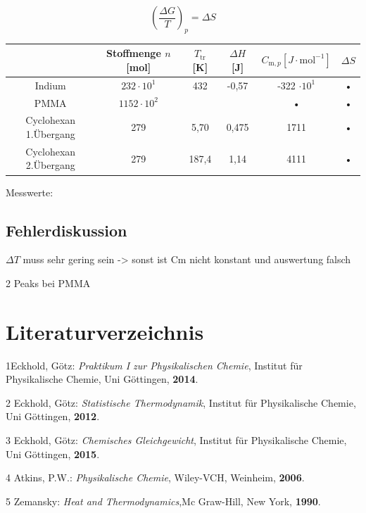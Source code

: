 \documentclass[a4paper,12pt,oneside,onecolum,final,openany]{report}
\begin{document}
\begin{equation}\label{S}
\left(\frac{\Delta G}{T}\right)_p = \Delta S
\end{equation}
\begin{tabular}{|c|c|c|c|c|c|}
\hline 
 & Stoffmenge $n$ [mol] & $T_\mathrm{tr}$ [K] & $\Delta H$ [J] & $C_{\mathrm{m},p} [J \cdot \mathrm{mol}^{-1}]$ & $\Delta S$ \\ 
\hline 
Indium & $232 \cdot 10^1$ & 432 & -0,57 & -322 $\cdot 10^1$ & • \\ 
\hline 
PMMA & $1152 \cdot 10^2$ &  &  & • & • \\ 
\hline 
Cyclohexan 1.Übergang & 279 & 5,70 & 0,475 & 1711 & • \\ 
Cyclohexan 2.Übergang & 279 & 187,4& 1,14 & 4111 & • \\
\hline 
\end{tabular} 



Messwerte:\\










\section{Fehlerdiskussion}
$\Delta T$ muss sehr gering sein -> sonst ist Cm nicht konstant und auswertung falsch

2 Peaks bei PMMA

\chapter{Literaturverzeichnis}
1\quad Eckhold, Götz: \emph{Praktikum I zur Physikalischen Chemie}, Institut für Physikalische Chemie, Uni Göttingen, \textbf{2014}.

\vspace{0,5 cm}

2 \quad Eckhold, Götz: \emph{Statistische Thermodynamik}, Institut für Physikalische Chemie, Uni Göttingen, \textbf{2012}.

\vspace{0,5cm}

3 \quad Eckhold, Götz: \emph{Chemisches Gleichgewicht}, Institut für Physikalische Chemie, Uni Göttingen, \textbf{2015}.\\

\vspace{0,5cm}

4 \quad Atkins, P.W.: \emph{Physikalische Chemie}, Wiley-VCH, Weinheim, \textbf{2006}.\\

\vspace{0,5cm}

5 \quad Zemansky: \emph{Heat and Thermodynamics},Mc Graw-Hill, New York, \textbf{1990}.\\
\end{document}
